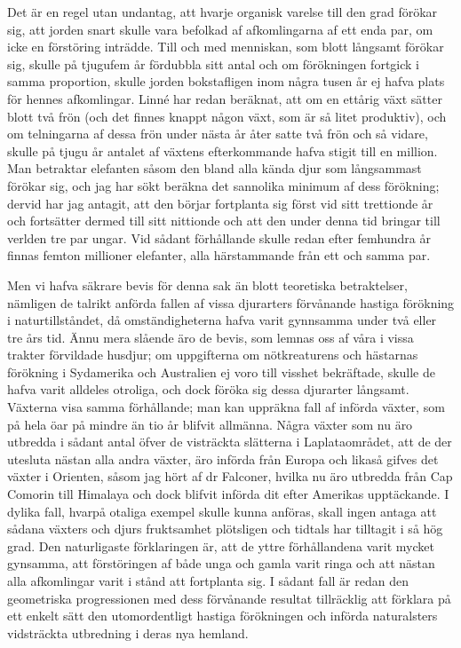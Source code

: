 Det är en regel utan undantag, att hvarje organisk varelse till den grad förökar sig, att jorden snart skulle vara befolkad af afkomlingarna af ett enda par, om icke en förstöring inträdde. Till och med menniskan, som blott långsamt förökar sig, skulle på tjugufem år fördubbla sitt antal och om förökningen fortgick i samma proportion, skulle jorden bokstafligen inom några tusen år ej hafva plats för hennes afkomlingar. Linné har redan beräknat, att om en ettårig växt sätter blott två frön (och det finnes knappt någon växt, som är så litet produktiv), och om telningarna af dessa frön under nästa år åter satte två frön och så vidare, skulle på tjugu år antalet af växtens efterkommande hafva stigit till en million. Man betraktar elefanten såsom den bland alla kända djur som långsammast förökar sig, och jag har sökt beräkna det sannolika minimum af dess förökning; dervid har jag antagit, att den börjar fortplanta sig först vid sitt trettionde år och fortsätter dermed till sitt nittionde och att den under denna tid bringar till verlden tre par ungar. Vid sådant förhållande skulle redan efter femhundra år finnas femton millioner elefanter, alla härstammande från ett och samma par.

Men vi hafva säkrare bevis för denna sak än blott teoretiska betraktelser, nämligen de talrikt anförda fallen af vissa djurarters förvånande hastiga förökning i naturtillståndet, då omständigheterna hafva varit gynnsamma under två eller tre års tid. Ännu mera slående äro de bevis, som lemnas oss af våra i vissa trakter förvildade husdjur; om uppgifterna om nötkreaturens och hästarnas förökning i Sydamerika och Australien ej voro till visshet bekräftade, skulle de hafva varit alldeles otroliga, och dock föröka sig dessa djurarter långsamt. Växterna visa samma förhållande; man kan uppräkna fall af införda växter, som på hela öar på mindre än tio år blifvit allmänna. Några växter som nu äro utbredda i sådant antal öfver de visträckta slätterna i Laplataområdet, att de der utesluta nästan alla andra växter, äro införda från Europa och likaså gifves det växter i Orienten, såsom jag hört af dr Falconer, hvilka nu äro utbredda från Cap Comorin till Himalaya och dock blifvit införda dit efter Amerikas upptäckande. I dylika fall, hvarpå otaliga exempel skulle kunna anföras, skall ingen antaga att sådana växters och djurs fruktsamhet plötsligen och tidtals har tilltagit i så hög grad. Den naturligaste förklaringen är, att de yttre förhållandena varit mycket gynsamma, att förstöringen af både unga och gamla varit ringa och att nästan alla afkomlingar varit i stånd att fortplanta sig. I sådant fall är redan den geometriska progressionen med dess förvånande resultat tillräcklig att förklara på ett enkelt sätt den utomordentligt hastiga förökningen och införda naturalsters vidsträckta utbredning i deras nya hemland.


